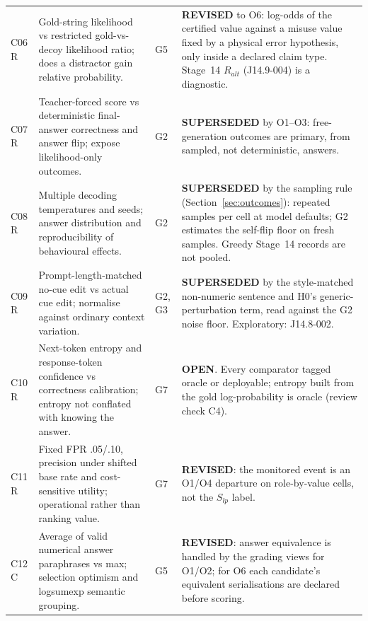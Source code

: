 \documentclass[10pt,a4paper]{article}
\begin{document}
\begin{longtable}{@{}P{1.2cm}P{7.2cm}P{1.3cm}P{5.6cm}@{}}
C06 \newline R & Gold-string likelihood vs restricted gold-vs-decoy likelihood ratio; does a distractor gain relative probability. & G5 &
\textbf{REVISED} to O6: log-odds of the certified value against a misuse value fixed by a physical error hypothesis, only inside a declared claim type. Stage~14 $R_{alt}$ (J14.9-004) is a diagnostic. \\
C07 \newline R & Teacher-forced score vs deterministic final-answer correctness and answer flip; expose likelihood-only outcomes. & G2 &
\textbf{SUPERSEDED} by O1--O3: free-generation outcomes are primary, from sampled, not deterministic, answers. \\
C08 \newline R & Multiple decoding temperatures and seeds; answer distribution and reproducibility of behavioural effects. & G2 &
\textbf{SUPERSEDED} by the sampling rule (Section~\ref{sec:outcomes}): repeated samples per cell at model defaults; G2 estimates the self-flip floor on fresh samples. Greedy Stage~14 records are not pooled. \\
C09 \newline R & Prompt-length-matched no-cue edit vs actual cue edit; normalise against ordinary context variation. & G2, G3 &
\textbf{SUPERSEDED} by the style-matched non-numeric sentence and H0's generic-perturbation term, read against the G2 noise floor. Exploratory: J14.8-002. \\
C10 \newline R & Next-token entropy and response-token confidence vs correctness calibration; entropy not conflated with knowing the answer. & G7 &
\textbf{OPEN}. Every comparator tagged oracle or deployable; entropy built from the gold log-probability is oracle (review check C4). \\
C11 \newline R & Fixed FPR .05/.10, precision under shifted base rate and cost-sensitive utility; operational rather than ranking value. & G7 &
\textbf{REVISED}: the monitored event is an O1/O4 departure on role-by-value cells, not the $S_{lp}$ label. \\
C12 \newline C & Average of valid numerical answer paraphrases vs max; selection optimism and logsumexp semantic grouping. & G5 &
\textbf{REVISED}: answer equivalence is handled by the grading views for O1/O2; for O6 each candidate's equivalent serialisations are declared before scoring. \\

\end{longtable}
\end{document}

